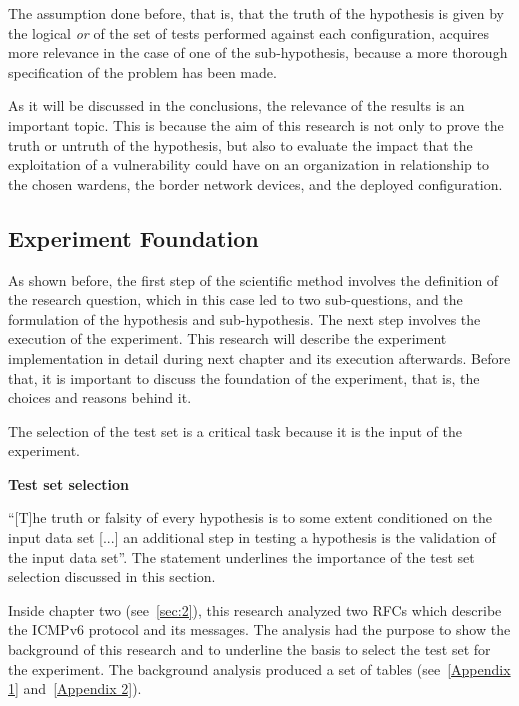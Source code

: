 \documentclass[12pt]{article}
\begin{document}
The assumption done before, that is, that the truth of the hypothesis is given by the logical \textit{or} of the set of tests performed against each configuration, acquires more relevance in the case of one of the sub-hypothesis, because a more thorough specification of the problem has been made.

As it will be discussed in the conclusions, the relevance of the results is an important topic. This is because the aim of this research is not only to prove the truth or untruth of the hypothesis, but also to evaluate the impact that the exploitation of a vulnerability could have on an organization in relationship to the chosen wardens, the border network devices, and the deployed configuration.

\subsection{Experiment Foundation}
\label{sub:expFound}

As shown before, the first step of the scientific method involves the definition of the research question, which in this case led to two sub-questions, and the formulation of the hypothesis and sub-hypothesis. The next step involves the execution of the experiment. This research will describe the experiment implementation in detail during next chapter and its execution afterwards. Before that, it is important to discuss the foundation of the experiment, that is, the choices and reasons behind it.

The selection of the test set is a critical task because it is the input of the experiment.

\textbf{Test set selection}
\label{subsub:testSel}

``[T]he truth or falsity of every hypothesis is to some extent conditioned on the input data set [...] an additional step in testing a hypothesis is the validation of the input data set''\cite{secExperiments}. The statement underlines the importance of the test set selection discussed in this section.

Inside chapter two (see~\ref{sec:2}), this research analyzed two RFCs which describe the ICMPv6 protocol and its messages. The analysis had the purpose to show the background of this research and to underline the basis to select the test set for the experiment. The background analysis produced a set of tables (see~\ref{Appendix 1} and~\ref{Appendix 2}). 
\end{document}
